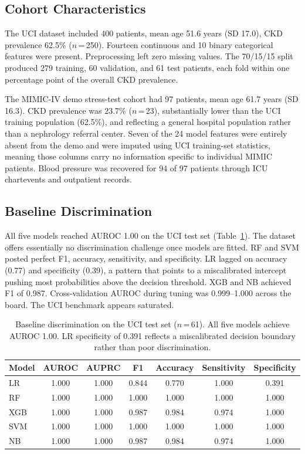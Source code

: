 \subsection{Cohort Characteristics}

The UCI dataset included 400 patients, mean age 51.6 years (SD 17.0), CKD prevalence 62.5\% ($n$\,=\,250). Fourteen continuous and 10 binary categorical features were present. Preprocessing left zero missing values. The 70/15/15 split produced 279 training, 60 validation, and 61 test patients, each fold within one percentage point of the overall CKD prevalence.

The MIMIC-IV demo stress-test cohort had 97 patients, mean age 61.7 years (SD 16.3). CKD prevalence was 23.7\% ($n$\,=\,23), substantially lower than the UCI training population (62.5\%), and reflecting a general hospital population rather than a nephrology referral center. Seven of the 24 model features were entirely absent from the demo and were imputed using UCI training-set statistics, meaning those columns carry no information specific to individual MIMIC patients. Blood pressure was recovered for 94 of 97 patients through ICU chartevents and outpatient records.

\subsection{Baseline Discrimination}

All five models reached AUROC 1.00 on the UCI test set (Table~\ref{tab:t1}). The dataset offers essentially no discrimination challenge once models are fitted. RF and SVM posted perfect F1, accuracy, sensitivity, and specificity. LR lagged on accuracy (0.77) and specificity (0.39), a pattern that points to a miscalibrated intercept pushing most probabilities above the decision threshold. XGB and NB achieved F1 of 0.987. Cross-validation AUROC during tuning was 0.999--1.000 across the board. The UCI benchmark appears saturated.

\begin{table}[ht]
\centering
\caption{Baseline discrimination on the UCI test set ($n$\,=\,61). All five models achieve AUROC 1.00. LR specificity of 0.391 reflects a miscalibrated decision boundary rather than poor discrimination.}
\label{tab:t1}
\begin{tabular}{lcccccc}
\toprule
Model & AUROC & AUPRC & F1 & Accuracy & Sensitivity & Specificity \\
\midrule
LR  & 1.000 & 1.000 & 0.844 & 0.770 & 1.000 & 0.391 \\
RF  & 1.000 & 1.000 & 1.000 & 1.000 & 1.000 & 1.000 \\
XGB & 1.000 & 1.000 & 0.987 & 0.984 & 0.974 & 1.000 \\
SVM & 1.000 & 1.000 & 1.000 & 1.000 & 1.000 & 1.000 \\
NB  & 1.000 & 1.000 & 0.987 & 0.984 & 0.974 & 1.000 \\
\bottomrule
\end{tabular}
\end{table}

